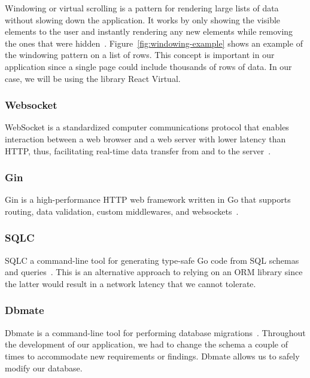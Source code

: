 Windowing or virtual scrolling is a pattern for rendering large lists of data without slowing down the application.
It works by only showing the visible elements to the user and instantly rendering any new elements while removing the ones that were hidden~\autocite{osmani_rendering_nodate}.
Figure~\ref{fig:windowing-example} shows an example of the windowing pattern on a list of rows.
This concept is important in our application since a single page could include thousands of rows of data. In our case, we will be using the library React Virtual.

\subsubsection{Websocket}

WebSocket is a standardized computer communications protocol that enables interaction between a web browser and a web server with lower latency than HTTP, thus, facilitating real-time data transfer from and to the server~\autocite{ubl_introducing_nodate}.

\subsubsection{Gin}

Gin is a high-performance HTTP web framework written in Go that supports routing, data validation, custom middlewares, and websockets~\autocite{noauthor_gin-gonic/gin_2021}.

\subsubsection{SQLC}

SQLC a command-line tool for generating type-safe Go code from SQL schemas and queries~\autocite{conroy_kyleconroy/sqlc_2021}.
This is an alternative approach to relying on an ORM library since the latter would result in a network latency that we cannot tolerate.

\subsubsection{Dbmate}

Dbmate is a command-line tool for performing database migrations~\autocite{macneil_amacneil/dbmate_2021}.
Throughout the development of our application, we had to change the schema a couple of times to accommodate new requirements or findings.
Dbmate allows us to safely modify our database.

